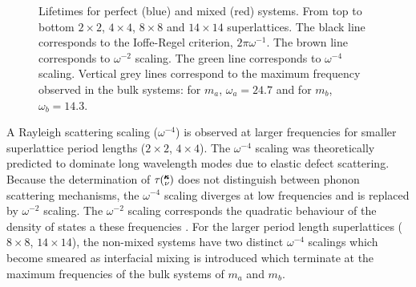 \documentclass[aps,prb,preprint,preprintnumbers,amsmath,amssymb,floatfix,superscriptaddress]{revtex4}
\newcommand{\kv}{\mspace{-4.0mu}\left(\mspace{-8.0mu}
\begin{smallmatrix}&\pmb{\kappa} \\&\nu\end{smallmatrix}
\mspace{-3.0mu}\right)}
\begin{document}
\renewcommand{\textfraction}{0.0}
\begin{figure}%
\begin{center}
\renewcommand{\figure}{Fig.}
\caption{Lifetimes for perfect (blue) and mixed (red) systems. From top to bottom $2\times2$, $4\times4$, $8\times8$ and $14\times14$ superlattices. The black line corresponds to the Ioffe-Regel criterion, $2\pi\omega^{-1}$. The brown line corresponds to $\omega^{-2}$ scaling. The green line corresponds to $\omega^{-4}$ scaling. Vertical grey lines correspond to the maximum frequency observed in the bulk systems: for $m_a$, $\omega_a=24.7$ and for $m_b$, $\omega_b=14.3$. } 
\label{FIG:lifetime}
\end{center}
\end{figure}

A Rayleigh scattering scaling ($\omega^{-4}$) is observed at larger frequencies for smaller superlattice period lengths ($2\times2$, $4\times4$). The $\omega^{-4}$ scaling was theoretically predicted to dominate long wavelength modes due to elastic defect scattering\cite{PhysRev.140.A1812,klemens_scattering_1955-3, klemens_thermal_1957-2}. Because the determination of $\tau\kv$ does not distinguish between phonon scattering mechanisms, the $\omega^{-4}$ scaling diverges at low frequencies and is replaced by $\omega^{-2}$ scaling. The $\omega^{-2}$ scaling corresponds the quadratic behaviour of the density of states a these frequencies \cite{Klemens_Thermal_1951}. For the larger period length superlattices ($8\times8$, $14\times14$), the non-mixed systems have two distinct $\omega^{-4}$ scalings which become smeared as interfacial mixing is introduced which terminate at the maximum frequencies of the bulk systems of $m_a$ and $m_b$.
\end{document}

